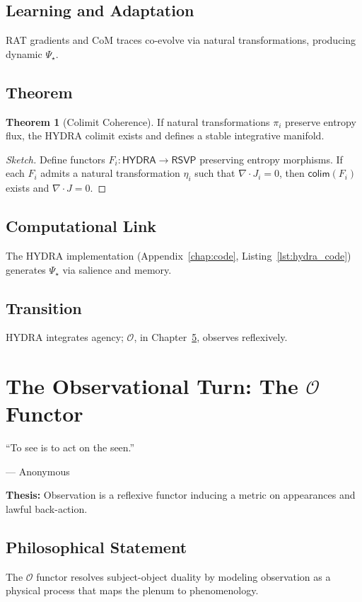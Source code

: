 \documentclass[12pt]{book}
\theoremstyle{definition}
\newtheorem{theorem}{Theorem}[chapter]
\begin{document}
\section{Learning and Adaptation}
RAT gradients and CoM traces co-evolve via natural transformations, producing dynamic \(\Psi_\star\).

\section{Theorem}
\begin{theorem}[Colimit Coherence]
\label{thm:colimit_coherence}
If natural transformations \(\pi_i\) preserve entropy flux, the HYDRA colimit exists and defines a stable integrative manifold.
\end{theorem}

\begin{proof}[Sketch]
Define functors \(F_i: \textsf{HYDRA} \to \textsf{RSVP}\) preserving entropy morphisms. If each \(F_i\) admits a natural transformation \(\eta_i\) such that \(\nabla \cdot J_i = 0\), then \(\textsf{colim}(F_i)\) exists and \(\nabla \cdot J = 0\).
\end{proof}

\section{Computational Link}
The HYDRA implementation (Appendix~\ref{chap:code}, Listing~\ref{lst:hydra_code}) generates \(\Psi_\star\) via salience and memory.

\section{Transition}
HYDRA integrates agency; \(\mathcal{O}\), in Chapter~\ref{chap:observation}, observes reflexively.

\chapter{The Observational Turn: The \texorpdfstring{\(\mathcal{O}\)}{O} Functor}
\label{chap:observation}
\epigraph{``To see is to act on the seen.''}{--- Anonymous}

\textbf{Thesis:} Observation is a reflexive functor inducing a metric on appearances and lawful back-action.

\section{Philosophical Statement}
The \(\mathcal{O}\) functor resolves subject-object duality by modeling observation as a physical process that maps the plenum to phenomenology.
\end{document}
